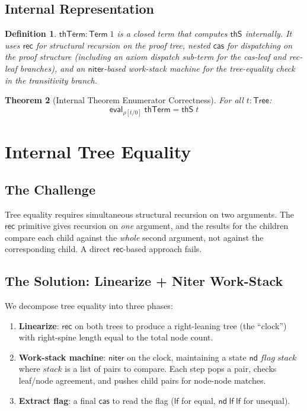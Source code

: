 \documentclass[11pt]{article}
\newtheorem{theorem}{Theorem}
\newtheorem{definition}[theorem]{Definition}
\newcommand{\lf}{\mathsf{lf}}
\newcommand{\nd}{\mathsf{nd}}
\newcommand{\cas}{\mathsf{cas}}
\newcommand{\rec}{\mathsf{rec}}
\newcommand{\niter}{\mathsf{niter}}
\newcommand{\eval}{\mathsf{eval}}
\newcommand{\thS}{\mathsf{thS}}
\newcommand{\thTerm}{\mathsf{thTerm}}
\newcommand{\Tree}{\mathsf{Tree}}
\newcommand{\Term}{\mathsf{Term}}
\begin{document}
\subsection{Internal Representation}

\begin{definition}
$\thTerm : \Term\;1$ is a closed term that computes $\thS$ internally.
It uses $\rec$ for structural recursion on the proof tree, nested $\cas$
for dispatching on the proof structure (including an \emph{axiom dispatch}
sub-term for the cas-leaf and rec-leaf branches), and an $\niter$-based
work-stack machine for the tree-equality check in the transitivity branch.
\end{definition}

\begin{theorem}[Internal Theorem Enumerator Correctness]
For all $t : \Tree$:
\[
  \eval_{\rho[t/0]}\;\thTerm = \thS\;t
\]
\end{theorem}

\section{Internal Tree Equality}

\subsection{The Challenge}

Tree equality requires simultaneous structural recursion on two arguments.
The $\rec$ primitive gives recursion on \emph{one} argument, and the results
for the children compare each child against the \emph{whole} second argument,
not against the corresponding child. A direct $\rec$-based approach fails.

\subsection{The Solution: Linearize + Niter Work-Stack}

We decompose tree equality into three phases:

\begin{enumerate}
  \item \textbf{Linearize}: $\rec$ on both trees to produce a right-leaning
    tree (the ``clock'') with right-spine length equal to the total node count.
  \item \textbf{Work-stack machine}: $\niter$ on the clock, maintaining a
    state $\nd\;\mathit{flag}\;\mathit{stack}$ where $\mathit{stack}$ is a list
    of pairs to compare. Each step pops a pair, checks leaf/node agreement,
    and pushes child pairs for node-node matches.
  \item \textbf{Extract flag}: a final $\cas$ to read the flag ($\lf$ for equal,
    $\nd\;\lf\;\lf$ for unequal).
\end{enumerate}
\end{document}
